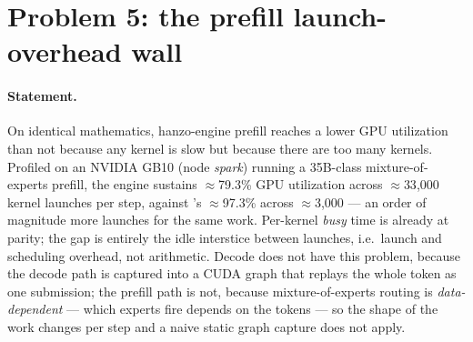 \documentclass[11pt]{article}
\begin{document}
\section{Problem 5: the prefill launch-overhead wall}
\label{sec:prefill}

\paragraph{Statement.} On identical mathematics, hanzo-engine prefill reaches a lower GPU utilization than
 not because any kernel is slow but because there are too many kernels. Profiled on an
NVIDIA GB10 (node \emph{spark}) running a 35B-class mixture-of-experts prefill, the engine sustains
$\approx$79.3\% GPU utilization across $\approx$33{,}000 kernel launches per step, against
's $\approx$97.3\% across $\approx$3{,}000 --- an order of magnitude more launches for the
same work. Per-kernel \emph{busy} time is already at parity; the gap is entirely the idle interstice
between launches, i.e.\ launch and scheduling overhead, not arithmetic. Decode does not have this problem,
because the decode path is captured into a CUDA graph that replays the whole token as one submission; the
prefill path is not, because mixture-of-experts routing is \emph{data-dependent} --- which experts fire
depends on the tokens --- so the shape of the work changes per step and a naive static graph capture does
not apply.
\end{document}
